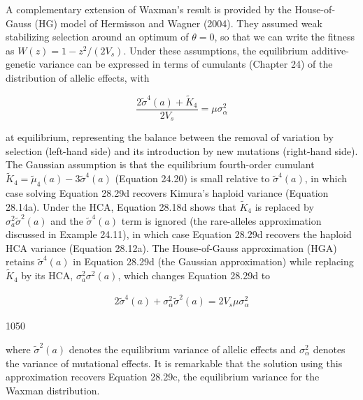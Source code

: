 \documentclass{article}
\begin{document}
A complementary extension of Waxman’s result is provided by the House-of-Gauss (HG) model of Hermisson and Wagner (2004). They assumed weak stabilizing selection around an optimum of  $ \theta = 0 $, so that we can write the fitness as  $ W(z) = 1 - z^2/(2V_s) $. Under these assumptions, the equilibrium additive-genetic variance can be expressed in terms of cumulants (Chapter 24) of the distribution of allelic effects, with

\begin{equation}
\frac{2\widetilde{\sigma}^{4}(a)+\widetilde{K}_{4}}{2V_{s}}=\mu\sigma_{\alpha}^{2}
\tag{28.29d}
\label{eq:28_29d}
\end{equation}

at equilibrium, representing the balance between the removal of variation by selection (left-hand side) and its introduction by new mutations (right-hand side). The Gaussian assumption is that the equilibrium fourth-order cumulant  $ \widetilde{K}_4 = \widetilde{\mu}_4(a) - 3\widetilde{\sigma}^4(a) $ (Equation 24.20) is small relative to  $ \widetilde{\sigma}^4(a) $, in which case solving Equation 28.29d recovers Kimura's haploid variance (Equation 28.14a). Under the HCA, Equation 28.18d shows that  $ \widetilde{K}_4 $ is replaced by  $ \sigma_a^2\widetilde{\sigma}^2(a) $ and the  $ \widetilde{\sigma}^4(a) $ term is ignored (the rare-alleles approximation discussed in Example 24.11), in which case Equation 28.29d recovers the haploid HCA variance (Equation 28.12a). The House-of-Gauss approximation (HGA) retains  $ \widetilde{\sigma}^4(a) $ in Equation 28.29d (the Gaussian approximation) while replacing  $ \widetilde{K}_4 $ by its HCA,  $ \sigma_a^2\sigma^2(a) $, which changes Equation 28.29d to

\begin{equation}
\begin{align*}2\widetilde{\sigma}^4(a)+\sigma^2_\alpha\widetilde{\sigma}^2(a)=2V_s\mu\sigma^2_\alpha\end{align*}
\tag{28.29e}
\label{eq:28_29e}
\end{equation}

1050

where  $ \widetilde{\sigma}^{2}(a) $ denotes the equilibrium variance of allelic effects and  $ \sigma_{\alpha}^{2} $ denotes the variance of mutational effects. It is remarkable that the solution using this approximation recovers Equation 28.29c, the equilibrium variance for the Waxman distribution.
\end{document}
